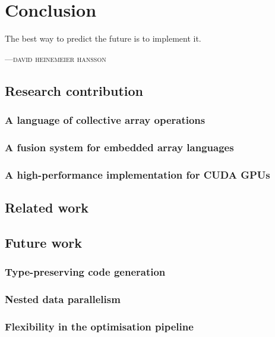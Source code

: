 %
%

\chapter{Conclusion}
\epigraph{The best way to predict the future is to implement it.}
{\textsc{---david heinemeier hansson}}

\section{Research contribution}
\subsection{A language of collective array operations}
\subsection{A fusion system for embedded array languages}
\subsection{A high-performance implementation for CUDA GPUs}

\section{Related work}

\section{Future work}
\subsection{Type-preserving code generation}
\subsection{Nested data parallelism}
\subsection{Flexibility in the optimisation pipeline}



